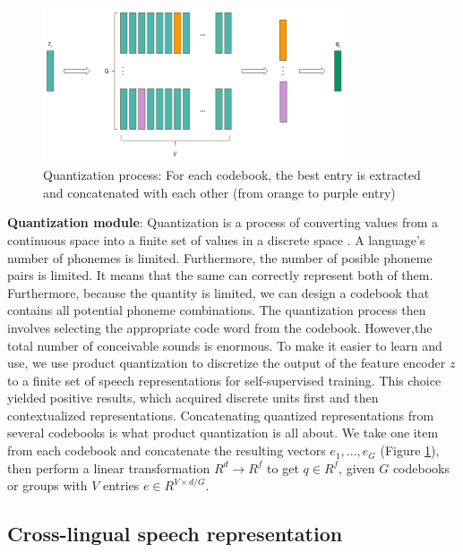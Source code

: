 \begin{figure}[hbtp]
    \centering
    \includegraphics[width=0.8\textwidth]{figures/quantization_process.png}
    \caption{Quantization process: For each codebook, the best entry is extracted and concatenated with each other (from orange to purple entry)}
    \label{quantization_process}
\end{figure}

\textbf{Quantization module}: Quantization is a process of converting values from a continuous space into a finite set of values in a discrete space \cite{wav2vec2_towardsdatascience}. 
A language's number of phonemes is limited. 
Furthermore, the number of posible phoneme pairs is limited. 
It means that the same  can correctly represent both of them. 
Furthermore, because the quantity is limited, we can design a codebook that contains all potential phoneme combinations. 
The quantization process then involves selecting the appropriate code word from the codebook. 
However,the total number of conceivable sounds is enormous. 
To make it easier to learn and use, we use product quantization \cite{product_quantization} to discretize the output of the feature encoder $z$ to a finite set of speech representations for self-supervised training. 
This choice yielded positive results, which acquired discrete units first and then contextualized representations. 
Concatenating quantized representations from several codebooks is what product quantization is all about. 
We take one item from each codebook and concatenate the resulting vectors $e_1,...,e_G$ (Figure \ref{quantization_process}), then perform a linear transformation $R^d \rightarrow R^f$ to get $q \in R^f$, given $G$ codebooks or groups with $V$ entries $e \in R^{V \times d/G}$. 


\subsection{Cross-lingual speech representation}


